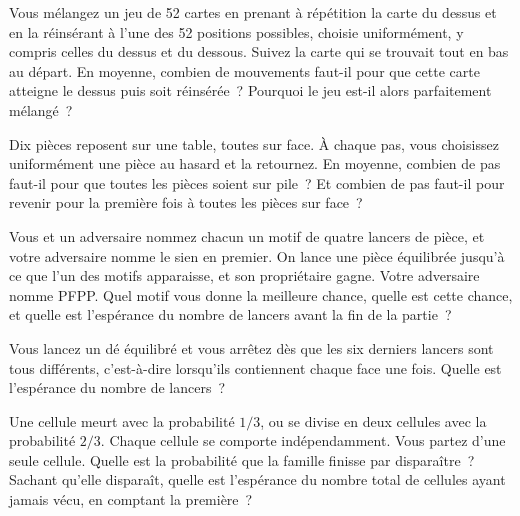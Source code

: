 \begin{question}\label{iq:iv1:waiting-times-and-markov-chains:20}
Vous mélangez un jeu de 52 cartes en prenant à répétition la carte du dessus et en la réinsérant à l'une des 52 positions possibles, choisie uniformément, y compris celles du dessus et du dessous. Suivez la carte qui se trouvait tout en bas au départ. En moyenne, combien de mouvements faut-il pour que cette carte atteigne le dessus puis soit réinsérée~? Pourquoi le jeu est-il alors parfaitement mélangé~?
\end{question}

\begin{question}\label{iq:iv1:waiting-times-and-markov-chains:21}
Dix pièces reposent sur une table, toutes sur face. À chaque pas, vous choisissez uniformément une pièce au hasard et la retournez. En moyenne, combien de pas faut-il pour que toutes les pièces soient sur pile~? Et combien de pas faut-il pour revenir pour la première fois à toutes les pièces sur face~?
\end{question}

\begin{question}\label{iq:iv1:waiting-times-and-markov-chains:22}
Vous et un adversaire nommez chacun un motif de quatre lancers de pièce, et votre adversaire nomme le sien en premier. On lance une pièce équilibrée jusqu'à ce que l'un des motifs apparaisse, et son propriétaire gagne. Votre adversaire nomme PFPP. Quel motif vous donne la meilleure chance, quelle est cette chance, et quelle est l'espérance du nombre de lancers avant la fin de la partie~?
\end{question}

\begin{question}\label{iq:iv1:waiting-times-and-markov-chains:23}
Vous lancez un dé équilibré et vous arrêtez dès que les six derniers lancers sont tous différents, c'est-à-dire lorsqu'ils contiennent chaque face une fois. Quelle est l'espérance du nombre de lancers~?
\end{question}

\begin{question}\label{iq:iv1:waiting-times-and-markov-chains:24}
Une cellule meurt avec la probabilité $1/3$, ou se divise en deux cellules avec la probabilité $2/3$. Chaque cellule se comporte indépendamment. Vous partez d'une seule cellule. Quelle est la probabilité que la famille finisse par disparaître~? Sachant qu'elle disparaît, quelle est l'espérance du nombre total de cellules ayant jamais vécu, en comptant la première~?
\end{question}

